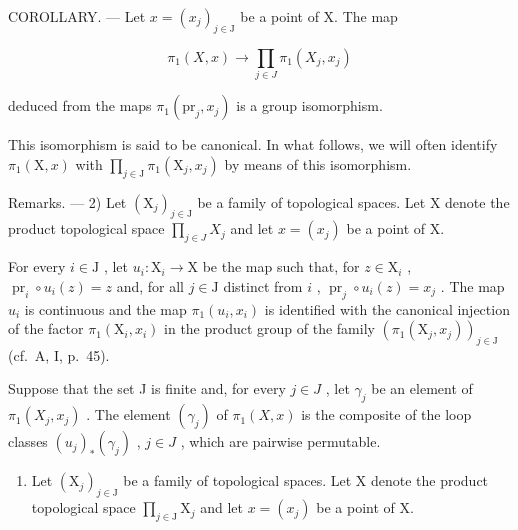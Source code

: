COROLLARY. --- Let \(x = (x_{j})_{j \in \mathrm{J}}\) be a point of X. The map

\[
\pi_ {1} (X, x) \to \prod_ {j \in J} \pi_ {1} (X _ {j}, x _ {j})
\]

deduced from the maps \(\pi_1(\mathrm{pr}_j, x_j)\) is a group isomorphism.

This isomorphism is said to be canonical. In what follows, we will often identify \(\pi_{1}(\mathrm{X},x)\) with \(\prod_{j\in\mathrm{J}}\pi_{1}(\mathrm{X}_{j},x_{j})\) by means of this isomorphism.

Remarks. --- 2) Let \((\mathrm{X}_{j})_{j\in\mathrm{J}}\) be a family of topological spaces. Let X denote the product topological space \(\prod_{j\in J}X_{j}\) and let \(x=(x_{j})\) be a point of X.

For every \(i \in \mathrm{J}\) , let \(u_i: \mathrm{X}_i \to \mathrm{X}\) be the map such that, for \(z \in \mathrm{X}_i\) , \(\operatorname{pr}_i \circ u_i(z) = z\) and, for all \(j \in \mathrm{J}\) distinct from \(i\) , \(\operatorname{pr}_j \circ u_i(z) = x_j\) . The map \(u_i\) is continuous and the map \(\pi_1(u_i, x_i)\) is identified with the canonical injection of the factor \(\pi_1(\mathrm{X}_i, x_i)\) in the product group of the family \((\pi_1(\mathrm{X}_j, x_j))_{j \in \mathrm{J}}\) (cf.~A, I, p.~45).

Suppose that the set J is finite and, for every \(j \in J\) , let \(\gamma_{j}\) be an element of \(\pi_{1}(X_{j}, x_{j})\) . The element \((\gamma_{j})\) of \(\pi_{1}(X, x)\) is the composite of the loop classes \((u_{j})_{*}(\gamma_{j})\) , \(j \in J\) , which are pairwise permutable.

\begin{enumerate}
\def\labelenumi{\arabic{enumi})}
\setcounter{enumi}{2}
\tightlist
\item
  Let \((\mathrm{X}_j)_{j\in \mathrm{J}}\) be a family of topological spaces. Let X denote the product topological space \(\prod_{j\in \mathrm{J}}\mathrm{X}_j\) and let \(x = (x_{j})\) be a point of X.
\end{enumerate}

